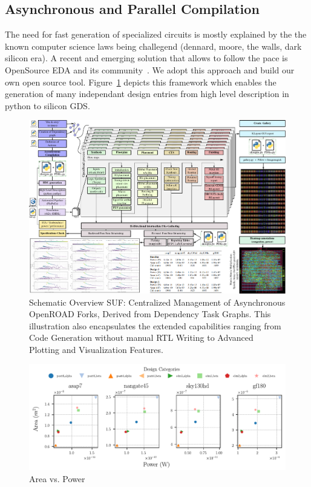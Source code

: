 \subsection{Asynchronous and Parallel Compilation}
\label{sec:framework}
The need for fast generation of specialized circuits is mostly explained by the the known computer science laws being challegend (dennard, moore, the walls, dark silicon era).
A recent and emerging solution that allows to follow the pace is OpenSource EDA and its community~\cite{Openroad}.
We adopt this approach and build our own open source tool.
Figure~\ref{fig:suf} depicts this framework which enables the generation of many independant design entries from high level description in python to silicon GDS.

\begin{figure}[t]
\centering
	\vspace{-0.5cm}
	\includegraphics[width=\columnwidth]{./figures/SUF.pdf}
	\vspace{-0.5cm}
	\caption{Schematic Overview SUF: Centralized Management of Asynchronous OpenROAD Forks, Derived from Dependency Task Graphs. This illustration also encapsulates the extended capabilities ranging from Code Generation without manual RTL Writing to Advanced Plotting and Visualization Features.}
	\label{fig:suf}
\end{figure}

\begin{figure}[b]
\centering
	\vspace{-0.5cm}
	\includegraphics[width=\columnwidth]{./figures/power_vs_area_comparison.pdf}
	\vspace{-0.5cm}
	\caption{Area vs. Power}
	\label{fig:power_vs_area}
\end{figure}

